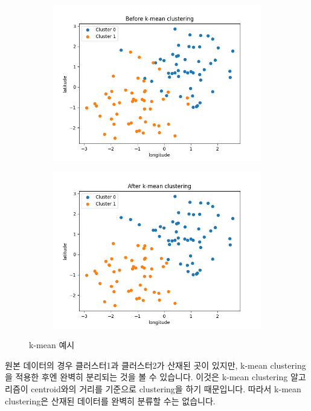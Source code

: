 \documentclass{oblivoir}
\begin{document}
  \begin{figure}[H]
    \begin{subfigure}[b]{.5\textwidth}
      \centering
      \includegraphics[width=\textwidth]{GPS_clustering_2.png}
    \end{subfigure}%
    \begin{subfigure}[b]{.5\textwidth}
      \centering
      \includegraphics[width=\textwidth]{GPS_clustering_3.png}      
    \end{subfigure}
    \caption{k-mean 예시}
  \end{figure}
  원본 데이터의 경우 클러스터1과 클러스터2가 산재된 곳이 있지만, k-mean clustering을 적용한 후엔 완벽히 분리되는 것을 볼 수 있습니다.
  이것은 k-mean clustering 알고리즘이 centroid와의 거리를 기준으로 clustering을 하기 때문입니다.
  따라서 k-mean clustering은 산재된 데이터를 완벽히 분류할 수는 없습니다.
\end{document}
